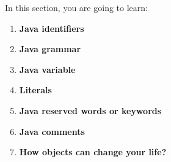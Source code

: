 \setlength{\columnsep}{3pt}
\begin{flushleft}
	\bigskip
	\bigskip
	\begin{tcolorbox}[breakable,notitle,boxrule=1pt,colback=black,colframe=black]
		\color{white}
		\bigskip
		In this section, you are going to learn:
		\begin{enumerate}
			\item \textbf{Java identifiers}
			\item \textbf{Java grammar}
			\item \textbf{Java variable}
			\item \textbf{Literals}
			\item \textbf{Java reserved words or keywords}
			\item \textbf{Java comments}
			\item \textbf{How objects can change your life?}
		\end{enumerate}	

	\end{tcolorbox}
		
\end{flushleft}

\newpage





